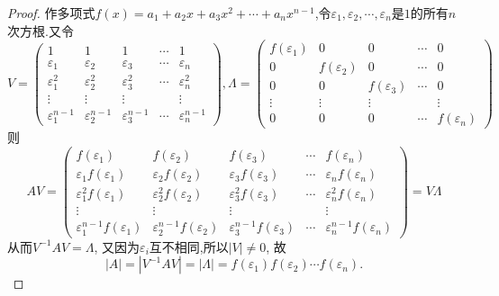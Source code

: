 \documentclass[../../main.tex]{subfiles}%
\begin{document}
\begin{proof}

作多项式\(f(x)=a_1 + a_2x + a_3x^2+\cdots+a_nx^{n - 1}\),令\(\varepsilon_1,\varepsilon_2,\cdots,\varepsilon_n\)是\(1\)的所有\(n\)次方根.又令
\[
V = 
\begin{pmatrix}
1 & 1 & 1 & \cdots & 1\\
\varepsilon_1 & \varepsilon_2 & \varepsilon_3 & \cdots & \varepsilon_n\\
\varepsilon_1^2 & \varepsilon_2^2 & \varepsilon_3^2 & \cdots & \varepsilon_n^2\\
\vdots & \vdots & \vdots & & \vdots\\
\varepsilon_1^{n - 1} & \varepsilon_2^{n - 1} & \varepsilon_3^{n - 1} & \cdots & \varepsilon_n^{n - 1}
\end{pmatrix},
\Lambda = 
\begin{pmatrix}
f(\varepsilon_1) & 0 & 0 & \cdots & 0\\
0 & f(\varepsilon_2) & 0 & \cdots & 0\\
0 & 0 & f(\varepsilon_3) & \cdots & 0\\
\vdots & \vdots & \vdots & & \vdots\\
0 & 0 & 0 & \cdots & f(\varepsilon_n)
\end{pmatrix}
\]
则
\[
AV = 
\begin{pmatrix}
f(\varepsilon_1) & f(\varepsilon_2) & f(\varepsilon_3) & \cdots & f(\varepsilon_n)\\
\varepsilon_1f(\varepsilon_1) & \varepsilon_2f(\varepsilon_2) & \varepsilon_3f(\varepsilon_3) & \cdots & \varepsilon_nf(\varepsilon_n)\\
\varepsilon_1^2f(\varepsilon_1) & \varepsilon_2^2f(\varepsilon_2) & \varepsilon_3^2f(\varepsilon_3) & \cdots & \varepsilon_n^2f(\varepsilon_n)\\
\vdots & \vdots & \vdots & & \vdots\\
\varepsilon_1^{n - 1}f(\varepsilon_1) & \varepsilon_2^{n - 1}f(\varepsilon_2) & \varepsilon_3^{n - 1}f(\varepsilon_3) & \cdots & \varepsilon_n^{n - 1}f(\varepsilon_n)
\end{pmatrix}
= V\Lambda
\]
从而$V^{-1}AV=\Lambda$,
又因为\(\varepsilon_i\)互不相同,所以\(|V|\neq0\),
故
\[
|A|=|V^{-1}AV| = |\Lambda| = f(\varepsilon_1)f(\varepsilon_2)\cdots f(\varepsilon_n).
\]

\end{proof}
\end{document}
